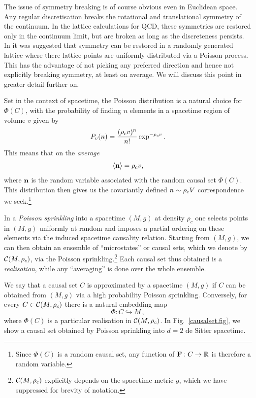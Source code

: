The issue of symmetry breaking is of course obvious even in Euclidean space. Any regular discretisation breaks the rotational
and translational  symmetry of the continuum. In the  lattice calculations for 
QCD, these symmetries are restored only  in the continuum limit, but 
are broken as long as the discreteness persists.  In \cite{tdlee} it was suggested
that symmetry can be restored in a  randomly generated  lattice where there lattice points are uniformly distributed via
a Poisson process. This has the advantage of not picking any preferred direction and hence not explicitly breaking
symmetry, at least on average. We will discuss this point in greater detail further on.  

Set in the context of spacetime, the Poisson distribution is a natural choice for $\Phi(C)$, with the probability of finding $n$ elements in a
spacetime region of volume $v$  given by 
\begin{equation} 
P_v(n)=\frac{(\rho_c v)^n}{n!}\exp^{-\rho_c v}.  
\label{eq:poisson} 
\end{equation} 
This means that on the \emph{average}
\begin{equation} 
\langle {\mathbf n} \rangle=\rho_c v, 
\end{equation}  
where $\mathbf n$ is the random variable associated with the random causal set $\Phi(C)$.   
This distribution then gives us the covariantly defined $n \sim  \rho_c V$ correspondence we seek.\footnote{Since $\Phi(C)$ is a random
  causal set, any function of ${\mathbf F}: C \rightarrow \mathbb R $ is therefore a random variable.} 

In a \emph{Poisson sprinkling} into a
spacetime $(M,g)$ at density $\rho_c$ one selects points in $(M,g)$ uniformly at random and imposes a partial ordering on these elements via the induced spacetime causality relation.  Starting from $(M,g)$, we can then
obtain an ensemble of ``microstates'' or   causal sets, which we denote by   $\mathcal C(M,\rho_c)$,  via  the Poisson sprinkling.\footnote{$\mathcal C(M,\rho_c)$
  explicitly depends on the spacetime metric $g$, which we have suppressed for brevity of notation.} Each causal set thus obtained is a
\emph{realisation}, while any ``averaging'' is done over the whole ensemble.

We say that a causal set $C$ is approximated by a spacetime $(M,g)$ if $C$ can be
obtained from  $(M,g)$ via  a high probability Poisson sprinkling. Conversely, for every  $C \in \mathcal C(M,\rho_c)$  there is a natural embedding map
\begin{equation}
\Phi: C \hookrightarrow  M \,,  
\end{equation}
where $\Phi(C)$ is a particular realisation in $\mathcal C(M,\rho_c)$. In Fig.~\ref{causalset.fig}, we show a causal set 
obtained by Poisson sprinkling into $d=2$ de Sitter spacetime.

